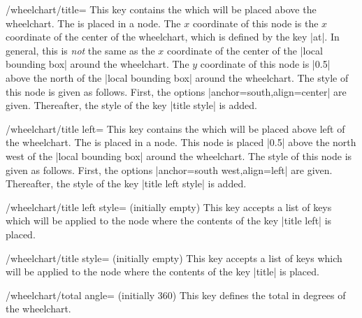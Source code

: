 \documentclass[a4paper,english,dvipsnames]{ltxdoc}
\begin{document}
\begin{key}{/wheelchart/title=}
This key contains the  which will be placed above the wheelchart. The  is placed in a node. The $x$ coordinate of this node is the $x$ coordinate of the center of the wheelchart, which is defined by the key |at|. In general, this is \emph{not} the same as the $x$ coordinate of the center of the |local bounding box| around the wheelchart. The $y$ coordinate of this node is |0.5| above the north of the |local bounding box| around the wheelchart. The style of this node is given as follows. First, the options |anchor=south,align=center| are given. Thereafter, the style of the key |title style| is added.
\end{key}
\begin{key}{/wheelchart/title left=}
This key contains the  which will be placed above left of the wheelchart. The  is placed in a node. This node is placed |0.5| above the north west of the |local bounding box| around the wheelchart. The style of this node is given as follows. First, the options |anchor=south west,align=left| are given. Thereafter, the style of the key |title left style| is added.
\end{key}
\begin{stylekey}{/wheelchart/title left style= (initially \normalfont empty)}
This key accepts a list of keys which will be applied to the node where the contents of the key |title left| is placed.
\end{stylekey}
\begin{stylekey}{/wheelchart/title style= (initially \normalfont empty)}
This key accepts a list of keys which will be applied to the node where the contents of the key |title| is placed.
\end{stylekey}
\begin{key}{/wheelchart/total angle= (initially 360)}
This key defines the total  in degrees of the wheelchart.
\end{key}
\end{document}
